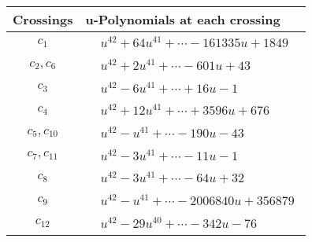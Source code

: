 \documentclass[1p]{elsarticle_modified}
\theoremstyle{definition}
\begin{document}
\begin{tabular}{m{50pt}|m{274pt}}
Crossings & \hspace{64pt}u-Polynomials at each crossing \\
\hline $$\begin{aligned}c_{1}\end{aligned}$$&$\begin{aligned}
&u^{42}+64 u^{41}+\cdots-161335 u+1849
\end{aligned}$\\
\hline $$\begin{aligned}c_{2},c_{6}\end{aligned}$$&$\begin{aligned}
&u^{42}+2 u^{41}+\cdots-601 u+43
\end{aligned}$\\
\hline $$\begin{aligned}c_{3}\end{aligned}$$&$\begin{aligned}
&u^{42}-6 u^{41}+\cdots+16 u-1
\end{aligned}$\\
\hline $$\begin{aligned}c_{4}\end{aligned}$$&$\begin{aligned}
&u^{42}+12 u^{41}+\cdots+3596 u+676
\end{aligned}$\\
\hline $$\begin{aligned}c_{5},c_{10}\end{aligned}$$&$\begin{aligned}
&u^{42}- u^{41}+\cdots-190 u-43
\end{aligned}$\\
\hline $$\begin{aligned}c_{7},c_{11}\end{aligned}$$&$\begin{aligned}
&u^{42}-3 u^{41}+\cdots-11 u-1
\end{aligned}$\\
\hline $$\begin{aligned}c_{8}\end{aligned}$$&$\begin{aligned}
&u^{42}-3 u^{41}+\cdots-64 u+32
\end{aligned}$\\
\hline $$\begin{aligned}c_{9}\end{aligned}$$&$\begin{aligned}
&u^{42}- u^{41}+\cdots-2006840 u+356879
\end{aligned}$\\
\hline $$\begin{aligned}c_{12}\end{aligned}$$&$\begin{aligned}
&u^{42}-29 u^{40}+\cdots-342 u-76
\end{aligned}$\\
\hline
\end{tabular}\\~\\
\end{document}
